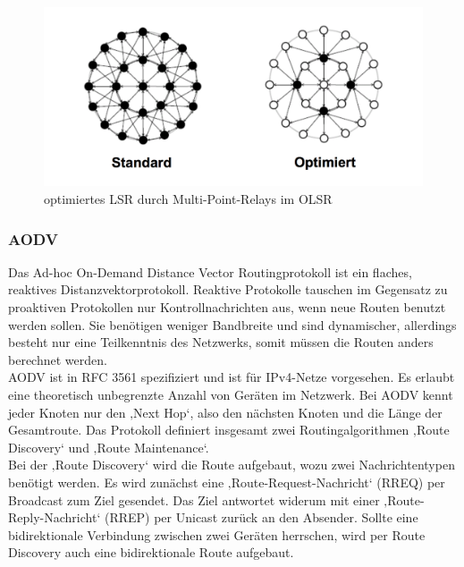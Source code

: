 \begin{figure}[H] 
	\centering
	\includegraphics[scale=0.5]{Bilder/olsr}
	\caption{optimiertes LSR durch Multi-Point-Relays im OLSR\cite{d:timm}}
	\label{f:olsr}
\end{figure}

\subsubsection{AODV}\label{ss:AODV}

Das Ad-hoc On-Demand Distance Vector Routingprotokoll ist ein flaches, reaktives Distanzvektorprotokoll. Reaktive Protokolle tauschen im Gegensatz zu proaktiven Protokollen nur Kontrollnachrichten aus, wenn neue Routen benutzt werden sollen. Sie benötigen weniger Bandbreite und sind dynamischer, allerdings besteht nur eine Teilkenntnis des Netzwerks, somit müssen die Routen anders berechnet werden.\\
AODV ist in RFC 3561 spezifiziert und ist für IPv4-Netze vorgesehen. Es erlaubt eine theoretisch unbegrenzte Anzahl von Geräten im Netzwerk. Bei AODV  kennt jeder Knoten nur den ‚Next Hop‘, also den nächsten Knoten und die Länge der Gesamtroute. Das Protokoll definiert insgesamt zwei Routingalgorithmen ‚Route Discovery‘ und ‚Route Maintenance‘.  \\

Bei der ‚Route Discovery‘ wird die Route aufgebaut, wozu zwei Nachrichtentypen benötigt werden. Es wird zunächst eine ‚Route-Request-Nachricht‘ (RREQ) per Broadcast zum Ziel gesendet. Das Ziel antwortet widerum mit einer ‚Route-Reply-Nachricht‘ (RREP) per Unicast zurück an den Absender. Sollte eine bidirektionale Verbindung zwischen zwei Geräten herrschen, wird per Route Discovery auch eine bidirektionale Route aufgebaut. \\

